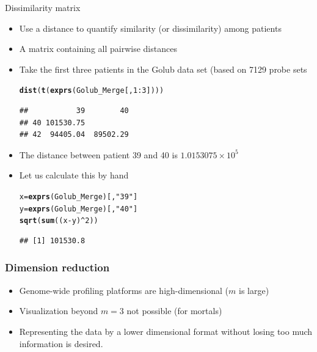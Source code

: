\documentclass[xcolor=x11names,compress]{beamer}\usepackage[]{graphicx}\usepackage[]{color}
\makeatletter
\newcommand{\hlnum}[1]{\textcolor[rgb]{0.686,0.059,0.569}{#1}}%
\newcommand{\hlstr}[1]{\textcolor[rgb]{0.192,0.494,0.8}{#1}}%
\newcommand{\hlopt}[1]{\textcolor[rgb]{0,0,0}{#1}}%
\newcommand{\hlstd}[1]{\textcolor[rgb]{0.345,0.345,0.345}{#1}}%
\newcommand{\hlkwb}[1]{\textcolor[rgb]{0.69,0.353,0.396}{#1}}%
\newcommand{\hlkwd}[1]{\textcolor[rgb]{0.737,0.353,0.396}{\textbf{#1}}}%
\newenvironment{kframe}{%
 \def\at@end@of@kframe{}%
 \ifinner\ifhmode%
  \def\at@end@of@kframe{\end{minipage}}%
  \begin{minipage}{\columnwidth}%
 \fi\fi%
 \def\FrameCommand##1{\hskip\@totalleftmargin \hskip-\fboxsep
 \colorbox{shadecolor}{##1}\hskip-\fboxsep
     \hskip-\linewidth \hskip-\@totalleftmargin \hskip\columnwidth}%
 \MakeFramed {\advance\hsize-\width
   \@totalleftmargin\z@ \linewidth\hsize
   \@setminipage}}%
 {\par\unskip\endMakeFramed%
 \at@end@of@kframe}
\newenvironment{knitrout}{}{} %
\makeatother
\begin{document}
\begin{frame}[fragile]{Dissimilarity matrix}
  \begin{itemize}
  \item Use a distance to quantify similarity (or dissimilarity) among patients
  \item A matrix containing all pairwise distances
  \item Take the first three patients in the Golub data set (based on
    7129 probe sets
\begin{knitrout}\tiny
{}\color{fgcolor}\begin{kframe}
\begin{alltt}
\hlkwd{dist}\hlstd{(}\hlkwd{t}\hlstd{(}\hlkwd{exprs}\hlstd{(Golub_Merge[,}\hlnum{1}\hlopt{:}\hlnum{3}\hlstd{])))}
\end{alltt}
\begin{verbatim}
##           39        40
## 40 101530.75          
## 42  94405.04  89502.29
\end{verbatim}
\end{kframe}
\end{knitrout}
\item The distance between patient 39 and 40 is 
  \ensuremath{1.0153075\times 10^{5}}
\item Let us calculate this by hand
\begin{knitrout}\tiny
{}\color{fgcolor}\begin{kframe}
\begin{alltt}
\hlstd{x}\hlkwb{=}\hlkwd{exprs}\hlstd{(Golub_Merge)[,}\hlstr{"39"}\hlstd{]}
\hlstd{y}\hlkwb{=}\hlkwd{exprs}\hlstd{(Golub_Merge)[,}\hlstr{"40"}\hlstd{]}
\hlkwd{sqrt}\hlstd{(}\hlkwd{sum}\hlstd{((x}\hlopt{-}\hlstd{y)}\hlopt{^}\hlnum{2}\hlstd{))}
\end{alltt}
\begin{verbatim}
## [1] 101530.8
\end{verbatim}
\end{kframe}
\end{knitrout}
\end{itemize}
\end{frame}


\begin{frame}
  \frametitle{Dimension reduction}
  \begin{itemize}
\item Genome-wide profiling platforms are high-dimensional ($m$ is large)
\item Visualization beyond $m=3$ not possible (for mortals)
\item Representing the data by a lower dimensional format without losing
      too much information is desired.
\end{itemize}
\end{frame}
\end{document}
